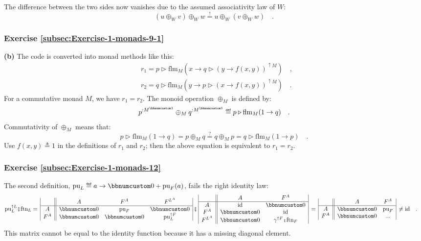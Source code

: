 The difference between the two sides now vanishes due to the assumed
associativity law of $W$:
\[
(u\oplus_{W}v)\oplus_{W}w\overset{!}{=}u\oplus_{W}(v\oplus_{W}w)\quad.
\]


\subsubsection*{Exercise \ref{subsec:Exercise-1-monads-9-1}}

\textbf{(b)} The code is converted into monad methods like this:
\begin{align*}
 & r_{1}=p\triangleright\text{flm}_{M}(x\rightarrow q\triangleright(y\rightarrow f(x,y))^{\uparrow M})\quad,\\
 & r_{2}=q\triangleright\text{flm}_{M}(y\rightarrow p\triangleright(x\rightarrow f(x,y))^{\uparrow M})\quad.
\end{align*}
For a commutative monad $M$, we have $r_{1}=r_{2}$. The monoid operation
$\oplus_{M}$ is defined by:
\[
p^{:M^{\bbnum 1}}\oplus_{M}q^{:M^{\bbnum 1}}\triangleq p\triangleright\text{flm}_{M}(1\rightarrow q)\quad.
\]
Commutativity of $\oplus_{M}$ means that:
\[
p\triangleright\text{flm}_{M}(1\rightarrow q)=p\oplus_{M}q\overset{?}{=}q\oplus_{M}p=q\triangleright\text{flm}_{M}(1\rightarrow p)\quad.
\]
Use $f(x,y)\triangleq1$ in the definitions of $r_{1}$ and $r_{2}$;
then the above equation is equivalent to $r_{1}=r_{2}$.

\subsubsection*{Exercise \ref{subsec:Exercise-1-monads-12}}

The second definition, $\text{pu}_{L}\triangleq a\rightarrow\bbnum 0+\text{pu}_{F}(a)$,
fails the right identity law:
\begin{align*}
 & \text{pu}_{L}^{\uparrow L}\bef\text{ftn}_{L}=\,\begin{array}{|c||ccc|}
 & A & F^{A} & F^{L^{A}}\\
\hline A & \bbnum 0 & \text{pu}_{F} & \bbnum 0\\
F^{A} & \bbnum 0 & \bbnum 0 & \text{pu}_{L}^{\uparrow F}
\end{array}\,\bef\,\begin{array}{|c||cc|}
 & A & F^{A}\\
\hline A & \text{id} & \bbnum 0\\
F^{A} & \bbnum 0 & \text{id}\\
F^{L^{A}} & \bbnum 0 & \gamma^{\uparrow F}\bef\text{ftn}_{F}
\end{array}\,=\,\begin{array}{|c||cc|}
 & A & F^{A}\\
\hline A & \bbnum 0 & \text{pu}_{F}\\
F^{A} & \bbnum 0 & ...
\end{array}\,\neq\text{id}\quad.
\end{align*}
This matrix cannot be equal to the identity function because it has
a missing diagonal element.

